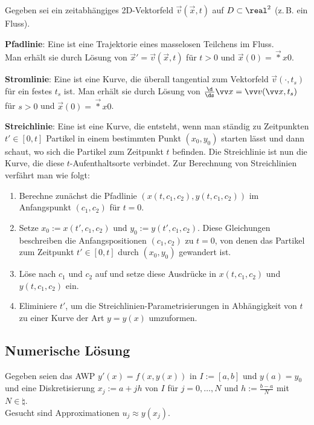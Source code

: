 Gegeben sei ein zeitabhängiges 2D-Vektorfeld $\vec{v}(\vec{x}, t)$ auf $D \subset \real^2$
(z.\,B. ein Fluss).

\textbf{Pfadlinie}:
Eine  ist eine Trajektorie eines masselosen Teilchens im Fluss.\\
Man erhält sie durch Lösung von $\vec{x}' = \vec{v}(\vec{x}, t)$ für $t > 0$ und
$\vec{x}(0) = \vec*{x}{0}$.

\textbf{Stromlinie}:
Eine  ist eine Kurve, die überall tangential zum
Vektorfeld $\vec{v}(\cdot, t_s)$ für ein festes $t_s$ ist.
Man erhält sie durch Lösung von $\frac{\d}{\ds}\vec{x} = \vec{v}(\vec{x}, t_s)$ für $s > 0$ und
$\vec{x}(0) = \vec*{x}{0}$.

\textbf{Streichlinie}:
Eine  ist eine Kurve, die entsteht, wenn man ständig zu Zeitpunkten
$t' \in [0, t]$ Partikel in einem bestimmten Punkt $(x_0, y_0)$ starten lässt
und dann schaut, wo sich die Partikel zum Zeitpunkt $t$ befinden.
Die Streichlinie ist nun die Kurve, die diese $t$-Aufenthaltsorte verbindet.
Zur Berechnung von Streichlinien verfährt man wie folgt:
\begin{enumerate}
    \item
    Berechne zunächst die Pfadlinie $(x(t, c_1, c_2), y(t, c_1, c_2))$
    im Anfangspunkt $(c_1, c_2)$ für $t = 0$.

    \item
    Setze $x_0 := x(t', c_1, c_2)$ und $y_0 := y(t', c_1, c_2)$.
    Diese Gleichungen beschreiben die Anfangspositionen $(c_1, c_2)$ zu $t = 0$,
    von denen das Partikel zum Zeitpunkt $t' \in [0, t]$ durch $(x_0, y_0)$ gewandert ist.

    \item
    Löse nach $c_1$ und $c_2$ auf und setze diese Ausdrücke in $x(t, c_1, c_2)$ und
    $y(t, c_1, c_2)$ ein.

    \item
    Eliminiere $t'$, um die Streichlinien-Parametrisierungen in Abhängigkeit von $t$
    zu einer Kurve der Art $y = y(x)$ umzuformen.
\end{enumerate}

\subsection{%
    Numerische Lösung%
}

Gegeben seien das AWP $y'(x) = f(x, y(x))$ in $I := [a, b]$ und $y(a) = y_0$
und eine Diskretisierung $x_j := a + jh$ von $I$ für $j = 0, \dotsc, N$ und $h := \frac{b-a}{N}$
mit $N \in \natural$.\\
Gesucht sind Approximationen $u_j \approx y(x_j)$.

